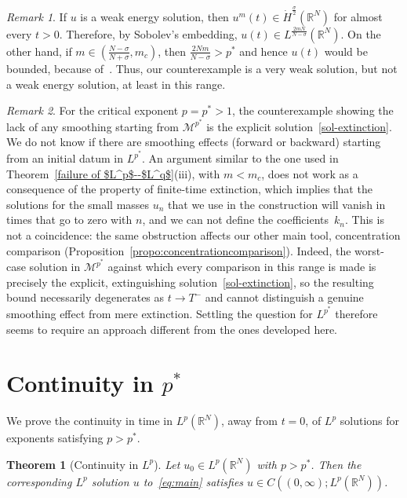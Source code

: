 \documentclass[leqno,12pt]{amsart}
\newtheorem{theorem}{Theorem}[section]
\theoremstyle{definition}
\theoremstyle{remark}
\newtheorem{remark}{Remark}
\numberwithin{equation}{section}
\begin{document}
\begin{remark}
    If $u$ is a weak energy solution, then $u^m(t)\in \dot{H}^{\frac\sigma2}(\mathbb{R}^N)$ for almost every $t>0$. Therefore, by Sobolev's embedding, $u(t)\in L^{\frac{2mN}{N-\sigma}}(\mathbb{R}^N)$. On the other hand, if $m\in(\frac{N-\sigma}{N+\sigma},m_c)$, then $\frac{2Nm}{N-\sigma}>p^*$ and hence $u(t)$ would be bounded, because of~\cite[Theorem 8.2]{b1}. Thus, our counterexample is a very weak solution, but not a weak energy solution, at least in this range.
\end{remark} 

\begin{remark} For the critical exponent $p=p^*>1$, the counterexample showing the lack of any smoothing starting from $\mathcal{M}^{p^*}$ is the explicit solution~\eqref{sol-extinction}. We do not know if there are smoothing effects (forward or backward) starting from  an initial datum in $L^{p^*}$. An argument similar to the one used in Theorem~\ref{failure of $L^p$--$L^q$}(iii), with $m<m_c$, does not work as a consequence of the property of finite-time extinction, which implies that the solutions for the small masses $u_n$ that we use in the  construction will vanish in times that go to zero with $n$, and we can not define the coefficients~$k_n$. This is not a coincidence: the same obstruction affects our other main tool, concentration comparison (Proposition~\ref{propo:concentrationcomparison}). Indeed, the worst-case solution in $\mathcal{M}^{p^*}$ against which every comparison in this range is made is precisely the explicit, extinguishing solution~\eqref{sol-extinction}, so the resulting bound necessarily degenerates as $t\to T^-$ and cannot distinguish a genuine smoothing effect from mere extinction. Settling the question for $L^{p^*}$ therefore seems to require an approach different from the ones developed here.
\end{remark}

\appendix


\section{Continuity in \texorpdfstring{$p^*$}{p*}}

We  prove the continuity in time in $L^p(\mathbb{R}^N)$, away from $t=0$, of $L^p$ solutions for exponents satisfying $p>p^*$. 

\begin{theorem}[Continuity in $L^p$]\label{Lp continuity}
    Let $u_0 \in L^p(\mathbb{R}^N) $ with $p > p^*$. Then the corresponding $L^p$ solution \( u \) to~\eqref{eq:main} satisfies $u \in C((0,\infty); L^p(\mathbb{R}^N))$.
\end{theorem}
\end{document}

